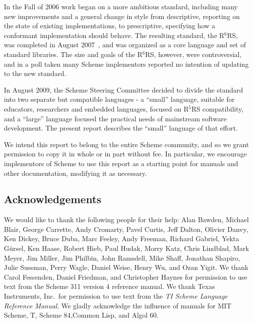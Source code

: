 In the Fall of 2006 work began on a more ambitious standard, including
many new improvements and a general change in style from descriptive,
reporting on the state of existing implementations, to prescriptive,
specifying how a conformant implementation should behave.  The
resulting standard, the R$^{6}$RS, was completed in August
2007~\cite{R6RS}, and was organized as a core language and set of
standard libraries.  The size and goals of the R$^{6}$RS, however,
were controversial, and in a poll taken many Scheme implementors
reported no intention of updating to the new standard.

In August 2009, the Scheme Steering Committee decided to divide the
standard into two separate but compatible languages - a ``small''
language, suitable for educators, researchers and embedded languages,
focused on R$^{5}$RS compatibility, and a ``large'' language focused
the practical needs of mainstream software development.
The present report describes the ``small'' language of that effort.




\medskip

We intend this report to belong to the entire Scheme community, and so
we grant permission to copy it in whole or in part without fee.  In
particular, we encourage implementors of Scheme to use this report as
a starting point for manuals and other documentation, modifying it as
necessary.




\subsection*{Acknowledgements}

We would like to thank the following people for their help: Alan Bawden, Michael
Blair, George Carrette, Andy Cromarty, Pavel Curtis, Jeff Dalton, Olivier Danvy,
Ken Dickey, Bruce Duba, Marc Feeley,
Andy Freeman, Richard Gabriel, Yekta G\"ursel, Ken Haase, Robert
Hieb, Paul Hudak, Morry Katz, Chris Lindblad, Mark Meyer, Jim Miller, Jim Philbin,
John Ramsdell, Mike Shaff, Jonathan Shapiro, Julie Sussman,
Perry Wagle, Daniel Weise, Henry Wu, and Ozan Yigit.
We thank Carol Fessenden, Daniel
Friedman, and Christopher Haynes for permission to use text from the Scheme 311
version 4 reference manual.  We thank Texas Instruments, Inc.~for permission to
use text from the {\em TI Scheme Language Reference Manual}\cite{TImanual85}.
We gladly acknowledge the influence of manuals for MIT Scheme\cite{MITScheme},
T\cite{Rees84}, Scheme 84\cite{Scheme84},Common Lisp\cite{CLtL},
and Algol 60\cite{Naur63}.


